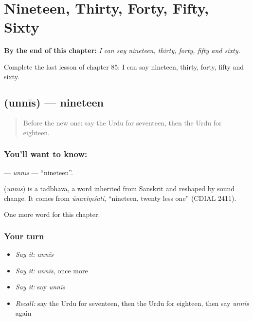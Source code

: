 
\chapter{Nineteen, Thirty, Forty, Fifty, Sixty}
\label{ch:ur-nineteen-thirty-forty-fifty-sixty}

\begin{chapteropening}
\textbf{By the end of this chapter:} \emph{I can say nineteen, thirty, forty, fifty and sixty.}

Complete the last lesson of chapter 85: I can say nineteen, thirty, forty, fifty and sixty.
\end{chapteropening}

\section[\texorpdfstring{\ur{انیس} (unnīs)}{انیس (unnīs)}]{ (unnīs) — nineteen}

\label{lesson:UR-C85-unnis}



\begin{quote}
Before the new one: say the Urdu for seventeen, then the Urdu for eighteen.
\end{quote}

\subsection*{You'll want to know: }
\textbf{} — \emph{unnīs} — \textquotedblleft{}nineteen\textquotedblright{}.

\begin{cousinweb}
\textbf{} (\emph{unnīs}) is a tadbhava, a word inherited from Sanskrit and reshaped by sound change. It comes from \emph{ūnaviṃśati}, \textquotedblleft{}nineteen, twenty less one\textquotedblright{} (CDIAL 2411).
\end{cousinweb}

\begin{grammarlens}[title={What you've built}]
One more word for this chapter.
\end{grammarlens}

\subsection*{Your turn}
\begin{itemize}
\raggedright
  \item \emph{Say it:} \emph{unnīs}
  \item \emph{Say it:} \emph{unnīs}, once more
  \item \emph{Say it:} say \emph{unnīs}
  \item \emph{Recall:} say the Urdu for seventeen, then the Urdu for eighteen, then say \emph{unnīs} again
\end{itemize}


